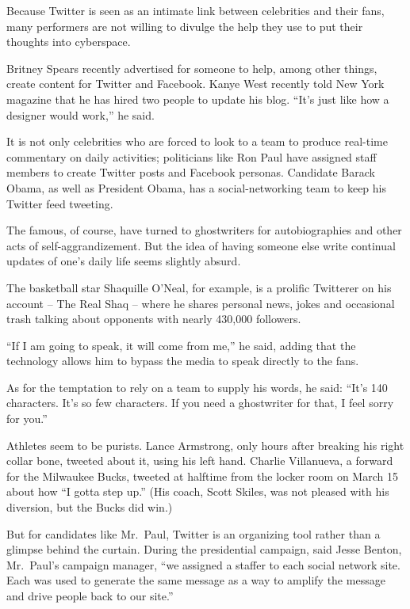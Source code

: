 \documentclass[12pt,a4paper,onecolumn]{article}
\begin{document}
\begin{CJK*}{GBK}{song}
Because Twitter is seen as an intimate link between celebrities and their fans, many performers are
not willing to divulge the help they use to put their thoughts into cyberspace.

Britney Spears recently advertised for someone to help, among other things, create content for
Twitter and Facebook. Kanye West recently told New York magazine that he has hired two people to
update his blog. ``It's just like how a designer would work,'' he said.

It is not only celebrities who are forced to look to a team to produce real-time commentary on daily
activities; politicians like Ron Paul have assigned staff members to create Twitter posts and
Facebook personas. Candidate Barack Obama, as well as President Obama, has a social-networking team
to keep his Twitter feed tweeting.

The famous, of course, have turned to ghostwriters for autobiographies and other acts of
self-aggrandizement. But the idea of having someone else write continual updates of one's daily life
seems slightly absurd.

The basketball star Shaquille O'Neal, for example, is a prolific Twitterer on his account -- The
Real Shaq -- where he shares personal news, jokes and occasional trash talking about opponents with
nearly 430,000 followers.

``If I am going to speak, it will come from me,'' he said, adding that the technology allows him to
bypass the media to speak directly to the fans.

As for the temptation to rely on a team to supply his words, he said: ``It's 140 characters. It's so
few characters. If you need a ghostwriter for that, I feel sorry for you.''

Athletes seem to be purists. Lance Armstrong, only hours after breaking his right collar bone,
tweeted about it, using his left hand. Charlie Villanueva, a forward for the Milwaukee Bucks,
tweeted at halftime from the locker room on March 15 about how ``I gotta step up.'' (His coach,
Scott Skiles, was not pleased with his diversion, but the Bucks did win.)

But for candidates like Mr.~Paul, Twitter is an organizing tool rather than a glimpse behind the
curtain. During the presidential campaign, said Jesse Benton, Mr.~Paul's campaign manager, ``we
assigned a staffer to each social network site. Each was used to generate the same message as a way
to amplify the message and drive people back to our site.''


\end{CJK*}
\end{document}
